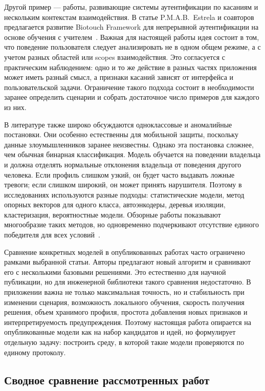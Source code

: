 \documentclass[oneside,senior,etd]{BYUPhys}
\begin{document}
Другой пример --- работы, развивающие системы аутентификации по касаниям и нескольким контекстам взаимодействия. В статье P.M.A.B.~Estrela и соавторов предлагается развитие Biotouch Framework для непрерывной аутентификации на основе обучения с учителем~\cite{estrela2021framework}. Важная для настоящей работы идея состоит в том, что поведение пользователя следует анализировать не в одном общем режиме, а с учетом разных областей или scopes взаимодействия. Это согласуется с практическим наблюдением: одно и то же действие в разных частях приложения может иметь разный смысл, а признаки касаний зависят от интерфейса и пользовательской задачи. Ограничение такого подхода состоит в необходимости заранее определить сценарии и собрать достаточное число примеров для каждого из них.

В литературе также широко обсуждаются одноклассовые и аномалийные постановки. Они особенно естественны для мобильной защиты, поскольку данные злоумышленников заранее неизвестны. Однако эта постановка сложнее, чем обычная бинарная классификация. Модель обучается на поведении владельца и должна отделять нормальные отклонения владельца от поведения другого человека. Если профиль слишком узкий, он будет часто выдавать ложные тревоги; если слишком широкий, он может принять нарушителя. Поэтому в исследованиях используются разные подходы: статистические модели, метод опорных векторов для одного класса, автоэнкодеры, деревья изоляции, кластеризация, вероятностные модели. Обзорные работы показывают многообразие таких методов, но одновременно подчеркивают отсутствие единого победителя для всех условий~\cite{stylios2021survey,abuhamad2021contemporary}.

Сравнение конкретных моделей в опубликованных работах часто ограничено рамками выбранной статьи. Авторы предлагают новый алгоритм и сравнивают его с несколькими базовыми решениями. Это естественно для научной публикации, но для инженерной библиотеки такого сравнения недостаточно. В приложении важна не только максимальная точность, но и стабильность при изменении сценария, возможность локального обучения, скорость получения решения, объем хранимого профиля, простота добавления новых признаков и интерпретируемость предупреждения. Поэтому настоящая работа опирается на опубликованные модели как на набор кандидатов и идей, но формулирует отдельную задачу: построить среду, в которой такие модели проверяются по единому протоколу.

\subsection{Сводное сравнение рассмотренных работ}
\end{document}
